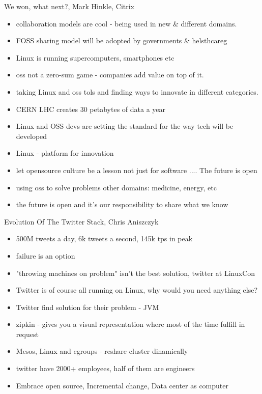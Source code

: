 \documentclass[aspectratio=169]{beamer}
\begin{document}
\begin{frame}{We won, what next?, Mark Hinkle, Citrix}
  \begin{itemize}
  \item collaboration models are cool - being used in new \& different domains.
  \item FOSS sharing model will be adopted by governments \& helsthcareg
  \item Linux is running supercomputers, smartphones etc
  \item oss not a zero-sum game - companies add value on top of it.
  \item taking Linux and oss tols and finding ways to innovate in different categories.
  \item CERN LHC creates 30 petabytes of data a year
  \item Linux and OSS devs are setting the standard for the way tech will be developed
  \item Linux - platform for innovation
  \item let opensource culture be a lesson not just for software .... The future is open
  \item using oss to solve problems other domains: medicine, energy, etc
  \item the future is open and it's our responsibility to share what we know
  \end{itemize}
\end{frame}

\begin{frame}{Evolution Of The Twitter Stack, Chris Aniszczyk}
  \begin{itemize}
  \item 500M tweets a day, 6k tweets a second, 145k tps in peak
  \item failure is an option
  \item "throwing machines on problem" isn't the best solution, twitter at LinuxCon
  \item Twitter is of course all running on Linux, why would you need anything else?
  \item Twitter find solution for their problem - JVM
  \item zipkin - gives you a visual representation where most of the time fulfill in request
  \item Mesos, Linux and cgroups - reshare cluster dinamically
  \item twitter have 2000+ employees, half of them are engineers
  \item Embrace open source, Incremental change, Data center as computer
  \end{itemize}
\end{frame}
\end{document}
